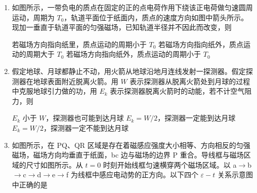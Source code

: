 \documentclass[\gkver]{gaokaozhenti}
\begin{document}
\begin{enumerate}
{故 C 选项正确，同理 D 选项正确。

}

\item
如图所示，一带负电的质点在固定的正的点电荷作用下绕该正电荷做匀速圆周运动，周期为 $T_{0}$，轨道平面位于纸面内，质点的速度方向如图中箭头所示。现加一垂直于轨道平面的匀强磁场，已知轨道半径并不因此而改变，则


{若磁场方向指向纸里，质点运动的周期小于 $T_{0}$}
{若磁场方向指向纸外，质点运动的周期大于 $T_{0}$}
{若磁场方向指向纸外，质点运动的周期小于 $T_{0}$}


\item
假定地球、月球都静止不动，用火箭从地球沿地月连线发射一探测器。假定探测器在地球表面附近脱离火箭。用 $W$ 表示探测器从脱离火箭处到月球的过程中克服地球引力做的功，用 $E_{k}$ 表示探测器脱离火箭时的动能，若不计空气阻力，则

{$E_{k}$ 小于 $W$，探测器也可能到达月球}
{$E_{k}=W/2$，探测器一定能到达月球}
{$E_{k}=W/2$，探测器一定不能到达月球}


\item
如图所示，在 PQ、QR 区域是存在着磁感应强度大小相等、方向相反的匀强磁场，磁场方向均垂直于纸面，bc 边与磁场的边界 P 重合。导线框与磁场区域的尺寸如图所示。从 $t=0$ 时刻开始线框匀速横穿两个磁场区域。以 a$\to$b$\to$c$\to$d$\to$e$\to$f 为线框中感应电动势的正方向。以下四个 $\varepsilon-t$ 关系示意图中正确的是


\end{enumerate}
\end{document}
